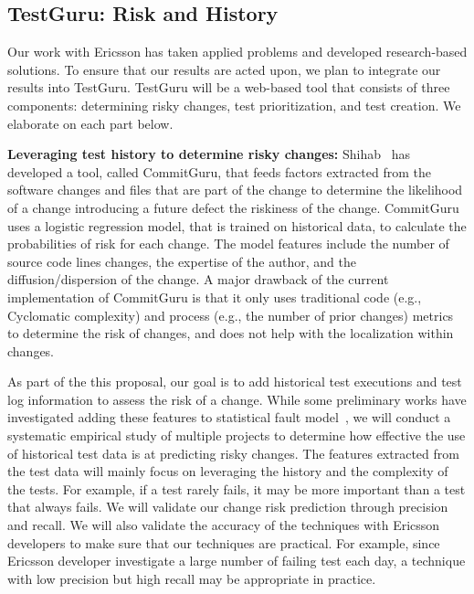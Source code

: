 \subsection{TestGuru: Risk and History}
\label{secTestGuru}

Our work with Ericsson has taken applied problems and developed research-based solutions. To ensure that our results are acted upon, we plan to integrate our results into TestGuru. TestGuru will be a web-based tool that consists of three components: determining risky changes, test prioritization, and test creation. We elaborate on each part below.

\textbf{Leveraging test history to determine risky changes:} Shihab~\cite{Rosen2015FSE} has developed a tool, called CommitGuru, that feeds factors extracted from the software changes and files that are part of the change to determine the likelihood of a change introducing a future defect \ie the riskiness of the change. CommitGuru uses a logistic regression model, that is trained on historical data, to calculate the probabilities of risk for each change. The model features include the number of source code lines changes, the expertise of the author, and the diffusion/dispersion of the change. A major drawback of the current implementation of CommitGuru is that it only uses traditional code (e.g., Cyclomatic complexity) and process (e.g., the number of prior changes) metrics to determine the risk of changes, and does not help with the localization within changes. 

As part of the this proposal, our goal is to add historical test executions and test log information to assess the risk of a change. While some preliminary works have investigated adding these features to statistical fault model~\cite{Herzig2014ISSRE}, we will conduct a systematic empirical study of multiple projects to determine how effective the use of historical test data is at predicting risky changes. The features extracted from the test data will mainly focus on leveraging the history and the complexity of the tests. For example, if a test rarely fails, it may be more important than a test that always fails. We will validate our change risk prediction through precision and recall. We will also validate the accuracy of the techniques with Ericsson developers to make sure that our techniques are practical. For example, since Ericsson developer investigate a large number of failing test each day, a technique with low precision but high recall may be appropriate in practice.

